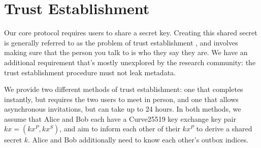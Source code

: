 \section{Trust Establishment}
\label{sec:trustestablishment}

Our core protocol requires users to share a secret key. Creating this shared secret is generally referred to as the problem of trust establishment \cite{unger2015sok}, and involves making sure that the person you talk to is who they say they are. We have an additional requirement that's mostly unexplored by the research community: the trust establishment procedure must not leak metadata.


We provide two different methods of trust establishment: one that completes instantly, but requires the two users to meet in person, and one that allows asynchronous invitations, but can take up to 24 hours. In both methods, we assume that Alice and Bob each have a Curve25519 key exchange key pair $kx = (kx^P, kx^S)$, and aim to inform each other of their $kx^P$ to derive a shared secret $k$. Alice and Bob additionally need to know each other's outbox indices.








